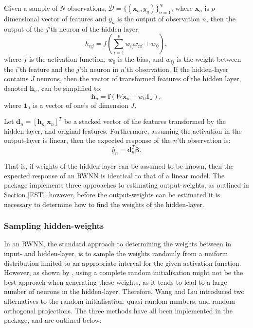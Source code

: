 \documentclass[
]{jss}
\begin{document}
Given a sample of \(N\) observations,
\(\mathcal D = \{(\boldsymbol x_n, y_n)\}_{n = 1}^N\), where
\(\boldsymbol x_n\) is \(p\) dimensional vector of features and \(y_n\)
is the output of observation \(n\), then the output of the \(j\)'th
neuron of the hidden layer: \begin{equation}
    h_{nj} = f\left(\sum_{i = 1}^p w_{ij} x_{ni} + w_{0}\right), \label{eq:hidden}
\end{equation} where \(f\) is the activation function, \(w_0\) is the
bias, and \(w_{ij}\) is the weight between the \(i\)'th feature and the
\(j\)'th neuron in \(n\)'th observation. If the hidden-layer contains
\(J\) neurons, then the vector of transformed features of the hidden
layer, denoted \(\boldsymbol h_{n}\), can be simplified to:
\begin{equation} 
    \boldsymbol h_n = \boldsymbol f\left(W \boldsymbol{x}_n + w_0 \boldsymbol{1}_{J}\right), 
\end{equation} where \(\boldsymbol{1}_{J}\) is a vector of one's of
dimension \(J\).

Let \(\boldsymbol d_n = [\boldsymbol h_n \; \boldsymbol x_n]^T\) be a
stacked vector of the features transformed by the hidden-layer, and
original features. Furthermore, assuming the activation in the
output-layer is linear, then the expected response of the \(n\)'th
observation is: \begin{equation}
    \hat{y}_n = \boldsymbol d^T_n \boldsymbol \beta.
\end{equation}

That is, if weights of the hidden-layer can be assumed to be known, then
the expected response of an RWNN is identical to that of a linear model.
The  package implements three approaches to estimating
output-weights, as outlined in Section \ref{EST}, however, before the
output-weights can be estimated it is necessary to determine how to find
the weights of the hidden-layer.

\hypertarget{HST}{%
\subsubsection{Sampling hidden-weights}\label{HST}}

In an RWNN, the standard approach to determining the weights between in
input- and hidden-layer, is to sample the weights randomly from a
uniform distribution limited to an appropriate interval for the given
activation function. However, as shown by \citep{Wang2017}, using a
complete random initialisation might not be the best approach when
generating these weights, as it tends to lead to a large number of
neurons in the hidden-layer. Therefore, Wang and Liu introduced two
alternatives to the random initialisation: quasi-random numbers, and
random orthogonal projections. The three methods have all been
implemented in the  package, and are outlined below:
\end{document}
